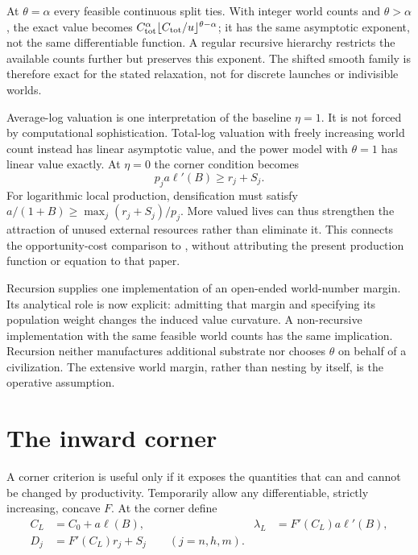 \documentclass[11pt,a4paper]{article}
\theoremstyle{definition}\newtheorem{definition}{Definition}
\begin{document}
At $\theta=\alpha$ every feasible continuous split ties. With integer
world counts and $\theta>\alpha$, the exact value becomes
$C_{\rm tot}^\alpha\lfloor C_{\rm tot}/u\rfloor^{\theta-\alpha}$;
it has the same asymptotic exponent, not the same differentiable function.
A regular recursive hierarchy restricts the available counts further but
preserves this exponent. The shifted smooth family is therefore exact for
the stated relaxation, not for discrete launches or indivisible worlds.

Average-log valuation is one interpretation of the baseline $\eta=1$.
It is not forced by computational sophistication. Total-log valuation
with freely increasing world count instead has linear asymptotic value,
and the power model with $\theta=1$ has linear value exactly. At
$\eta=0$ the corner condition becomes
\begin{equation}
 p_ja\ell'(B)\geq r_j+S_j.
 \label{eq:totalist-corner}
\end{equation}
For logarithmic local production, densification must satisfy
$a/(1+B)\geq\max_j(r_j+S_j)/p_j$. More valued lives can thus strengthen
the attraction of unused external resources rather than eliminate it.
This connects the opportunity-cost comparison to
\citet{Bostrom2003Waste}, without attributing the present production
function or equation to that paper.

Recursion supplies one implementation of an open-ended world-number
margin. Its analytical role is now explicit: admitting that margin and
specifying its population weight changes the induced value curvature.
A non-recursive implementation with the same feasible world counts has
the same implication. Recursion neither manufactures additional substrate
nor chooses $\theta$ on behalf of a civilization. The extensive world
margin, rather than nesting by itself, is the operative assumption.

\section{The inward corner}
\label{sec:inward}
\label{sec:threshold}

A corner criterion is useful only if it exposes the quantities that can
and cannot be changed by productivity. Temporarily allow any
differentiable, strictly increasing, concave $F$. At the corner define
\begin{align}
 C_L&=C_0+a\ell(B),&
 \lambda_L&=F'(C_L)a\ell'(B),\label{eq:local-return}\\
 D_j&=F'(C_L)r_j+S_j\qquad(j=n,h,m).
 \label{eq:external-return}
\end{align}
\end{document}
